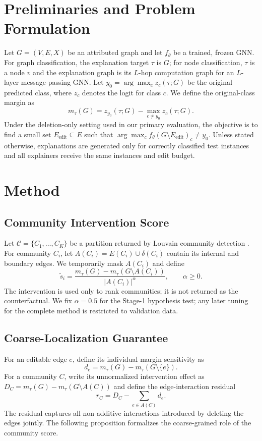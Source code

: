 \documentclass[runningheads]{llncs}
\begin{document}
\section{Preliminaries and Problem Formulation}
\label{sec:preliminaries}

Let $G=(V,E,X)$ be an attributed graph and let $f_\theta$ be a trained,
frozen GNN. For graph classification, the explanation target $\tau$ is $G$;
for node classification, $\tau$ is a node $v$ and the explanation graph is its
$L$-hop computation graph for an $L$-layer message-passing GNN. Let
$y_0=\arg\max_c z_c(\tau;G)$ be the original predicted class, where $z_c$
denotes the logit for class $c$. We define the original-class margin as
\begin{equation}
  m_\tau(G)=z_{y_0}(\tau;G)-\max_{c\ne y_0}z_c(\tau;G).
\end{equation}
Under the deletion-only setting used in our primary evaluation, the objective
is to find a small set $E_{\mathrm{edit}}\subseteq E$ such that
$\arg\max_c f_\theta(G\setminus E_{\mathrm{edit}})_c\ne y_0$. Unless stated
otherwise, explanations are generated only for correctly classified test
instances and all explainers receive the same instances and edit budget.

\section{Method}
\label{sec:method}

\subsection{Community Intervention Score}
Let $\mathcal{C}=\{C_1,\ldots,C_K\}$ be a partition returned by Louvain
community detection \cite{blondel2008louvain}. For community $C_i$, let
$A(C_i)=E(C_i)\cup\delta(C_i)$ contain its internal and boundary edges. We
temporarily mask $A(C_i)$ and define
\begin{equation}
  \widetilde{s}_i=
  \frac{m_\tau(G)-m_\tau(G\setminus A(C_i))}{|A(C_i)|^\alpha},
  \qquad \alpha\geq 0.
\end{equation}
The intervention is used only to rank communities; it is not returned as the
counterfactual. We fix $\alpha=0.5$ for the Stage-1 hypothesis test; any later
tuning for the complete method is restricted to validation data.

\subsection{Coarse-Localization Guarantee}
For an editable edge $e$, define its individual margin sensitivity as
\begin{equation}
  d_e=m_\tau(G)-m_\tau(G\setminus\{e\}).
\end{equation}
For a community $C$, write its unnormalized intervention effect as
$D_C=m_\tau(G)-m_\tau(G\setminus A(C))$ and define the edge-interaction
residual
\begin{equation}
  r_C=D_C-\sum_{e\in A(C)}d_e.
\end{equation}
The residual captures all non-additive interactions introduced by deleting
the edges jointly. The following proposition formalizes the coarse-grained
role of the community score.
\end{document}
